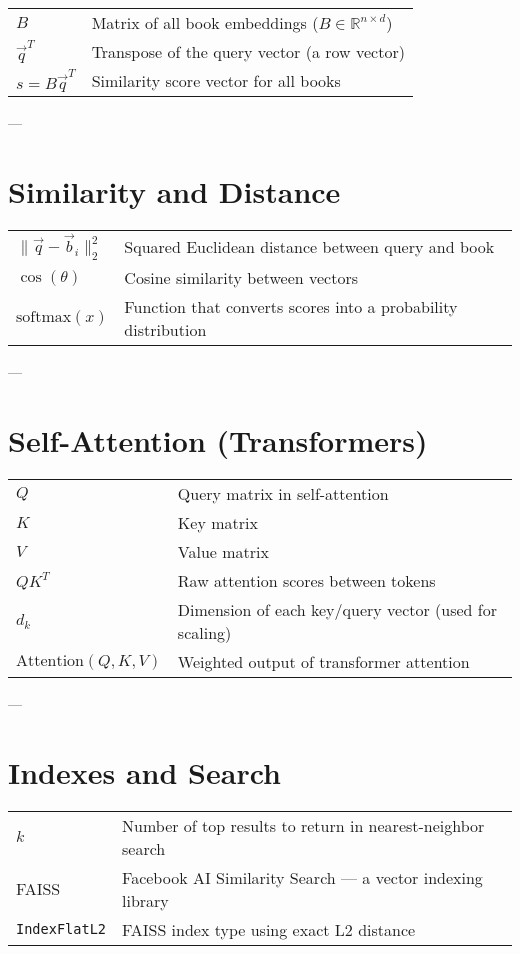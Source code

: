 \begin{tabular}{lp{10cm}}
    $B$ & Matrix of all book embeddings ($B \in \mathbb{R}^{n \times d}$) \\
    $\vec{q}^T$ & Transpose of the query vector (a row vector) \\
    $s = B \vec{q}^T$ & Similarity score vector for all books \\
\end{tabular}

\vspace{1em}

---

\section*{Similarity and Distance}

\begin{tabular}{lp{10cm}}
    $\|\vec{q} - \vec{b}_i\|_2^2$ & Squared Euclidean distance between query and book \\
    $\cos(\theta)$ & Cosine similarity between vectors \\
    $\text{softmax}(x)$ & Function that converts scores into a probability distribution \\
\end{tabular}

\vspace{1em}

---

\section*{Self-Attention (Transformers)}

\begin{tabular}{lp{10cm}}
    $Q$ & Query matrix in self-attention \\
    $K$ & Key matrix \\
    $V$ & Value matrix \\
    $QK^T$ & Raw attention scores between tokens \\
    $d_k$ & Dimension of each key/query vector (used for scaling) \\
    $\text{Attention}(Q, K, V)$ & Weighted output of transformer attention \\
\end{tabular}

\vspace{1em}

---

\section*{Indexes and Search}

\begin{tabular}{lp{10cm}}
    $k$ & Number of top results to return in nearest-neighbor search \\
    FAISS & Facebook AI Similarity Search — a vector indexing library \\
    \texttt{IndexFlatL2} & FAISS index type using exact L2 distance \\
\end{tabular}
